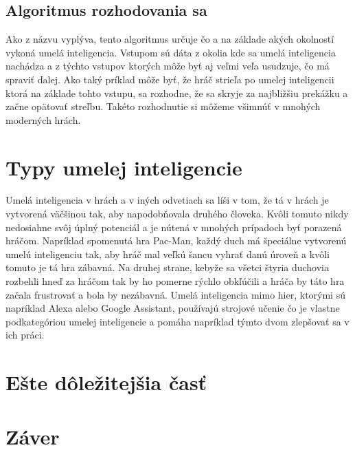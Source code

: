 \documentclass[10pt,oneside,slovak,a4paper]{article}
\begin{document}
\subsection{Algoritmus rozhodovania sa} \label{kapitola3.2}
Ako z názvu vyplýva, tento algoritmus určuje čo a na základe akých okolností vykoná umelá inteligencia. Vstupom sú dáta z okolia kde sa umelá inteligencia nachádza a z týchto vstupov ktorých môže byť aj veľmi veľa usudzuje, čo má spraviť ďalej. Ako taký príklad môže byť, že hráč strieľa po umelej inteligencii ktorá na základe tohto vstupu, sa rozhodne, že sa skryje za najbližšiu prekážku a začne opätovať streľbu. Takéto rozhodnutie si môžeme všimnúť v mnohých moderných hrách.


\section{Typy umelej inteligencie} \label{kapitola4}
Umelá inteligencia v hrách a v iných odvetiach sa líši v tom, že tá v hrách je vytvorená väčšinou tak, aby napodobňovala druhého človeka. Kvôli tomuto nikdy nedosiahne svôj úplný potenciál a je nútená v mnohých prípadoch byť porazená hráčom. Napríklad spomenutá hra Pac-Man, každý duch má špeciálne vytvorenú umelú inteligenciu tak, aby hráč mal veľkú šancu vyhrať danú úroveň a kvôli tomuto je tá hra zábavná. Na druhej strane, kebyže sa všetci štyria duchovia rozbehli hneď za hráčom tak by ho pomerne rýchlo obkľúčili a hráča by táto hra začala frustrovať a bola by nezábavná. Umelá inteligencia mimo hier, ktorými sú napríklad Alexa alebo Google Assistant, používajú strojové učenie čo je vlastne podkategóriou umelej inteligencie a pomáha napríklad týmto dvom zlepšovať sa v ich práci.




\section{Ešte dôležitejšia časť} \label{dolezitejsia}




\section{Záver} \label{zaver} %






\end{document}
